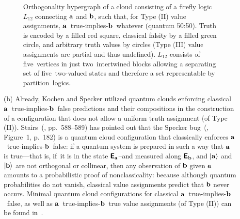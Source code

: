 \begin{enumerate}[leftmargin=2.3em,labelsep=4mm]
\begin{figure}[H]
\begin{center}
\begin{tikzpicture} [scale=0.20]
\end{tikzpicture}
\end{center}
\caption{
\label{2018-c-f-firefly}
Orthogonality hypergraph of a cloud consisting of a
firefly logic $L_{12}$ connecting ${\bf a}$ and ${\bf b}$, such that, for Type (II) value assignments, ${\bf a}$~true-implies-${\bf b}$~whatever (quantum 50:50).
Truth is encoded by a filled red square, classical falsity by a filled green circle, and arbitrary truth values by circles
(Type (III) value assignments are partial and thus undefined).
$L_{12}$ consists of five~vertices in just two~intertwined blocks allowing
a separating set of five~two-valued states and therefore a set representable by partition~logics.}
\end{figure}


\item[(b)]
Already, Kochen and Specker utilized quantum clouds enforcing classical ${\bf a}$~true-implies-${\bf b}$~false predictions
and their compositions in the construction of a configuration that does not allow a uniform truth assignment (of Type (II)).
Stairs~(\cite{stairs83}, pp.~588--589) has pointed out that the Specker bug~(\cite{Kochen2}, Figure~1, p.~182)
is a quantum cloud configuration that classically enforces ${\bf a}$~true-implies-${\bf b}$~false:
if a quantum system is prepared in such a way that ${\bf a}$ is true---that is, if~it is in the state $\textsf{\textbf{E}}_{\bf a}$--and measured along $\textsf{\textbf{E}}_{\bf b}$, and
$\vert {\bf a} \rangle$ and
$\vert {\bf b} \rangle$
are not orthogonal or collinear, then any observation of ${\bf b}$ given ${\bf a}$ amounts to a probabilistic proof of nonclassicality:
because although quantum probabilities do not vanish, classical value assignments predict that ${\bf b}$ never occurs.
Minimal quantum cloud configurations for classical ${\bf a}$~true-implies-${\bf b}$~false,
as well as ${\bf a}$~true-implies-${\bf b}$~true value assignments (of Type (II)) can be found in~\cite{2018-minimalYIYS}.


\end{enumerate}
